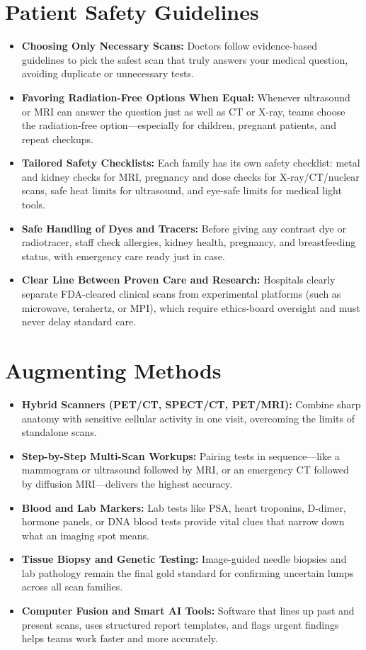 \section{Patient Safety Guidelines}
\begin{itemize}
  \item \textbf{Choosing Only Necessary Scans:} Doctors follow evidence-based guidelines to pick the safest scan that truly answers your medical question, avoiding duplicate or unnecessary tests.
  \item \textbf{Favoring Radiation-Free Options When Equal:} Whenever ultrasound or MRI can answer the question just as well as CT or X-ray, teams choose the radiation-free option---especially for children, pregnant patients, and repeat checkups.
  \item \textbf{Tailored Safety Checklists:} Each family has its own safety checklist: metal and kidney checks for MRI, pregnancy and dose checks for X-ray/CT/nuclear scans, safe heat limits for ultrasound, and eye-safe limits for medical light tools.
  \item \textbf{Safe Handling of Dyes and Tracers:} Before giving any contrast dye or radiotracer, staff check allergies, kidney health, pregnancy, and breastfeeding status, with emergency care ready just in case.
  \item \textbf{Clear Line Between Proven Care and Research:} Hospitals clearly separate FDA-cleared clinical scans from experimental platforms (such as microwave, terahertz, or MPI), which require ethics-board oversight and must never delay standard care.
\end{itemize}

\section{Augmenting Methods}
\begin{itemize}
  \item \textbf{Hybrid Scanners (PET/CT, SPECT/CT, PET/MRI):} Combine sharp anatomy with sensitive cellular activity in one visit, overcoming the limits of standalone scans.
  \item \textbf{Step-by-Step Multi-Scan Workups:} Pairing tests in sequence---like a mammogram or ultrasound followed by MRI, or an emergency CT followed by diffusion MRI---delivers the highest accuracy.
  \item \textbf{Blood and Lab Markers:} Lab tests like PSA, heart troponins, D-dimer, hormone panels, or DNA blood tests provide vital clues that narrow down what an imaging spot means.
  \item \textbf{Tissue Biopsy and Genetic Testing:} Image-guided needle biopsies and lab pathology remain the final gold standard for confirming uncertain lumps across all scan families.
  \item \textbf{Computer Fusion and Smart AI Tools:} Software that lines up past and present scans, uses structured report templates, and flags urgent findings helps teams work faster and more accurately.
\end{itemize}


